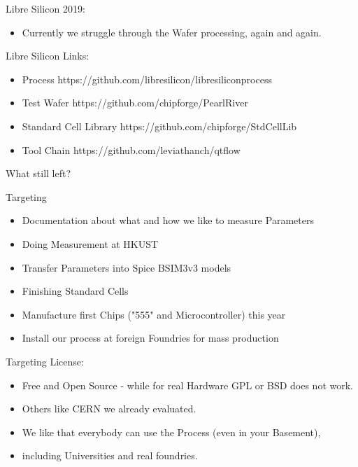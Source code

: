 \documentclass{beamer}
\begin{document}
\begin{frame}{Libre Silicon}
2019:
\begin{itemize}
\item Currently we struggle through the Wafer processing, again and again.
\end{itemize}
\end{frame}

\begin{frame}{Libre Silicon}
Links:
\begin{itemize}
\item Process
https://github.com/libresilicon/libresiliconprocess
\item Test Wafer
https://github.com/chipforge/PearlRiver
\item Standard Cell Library
https://github.com/chipforge/StdCellLib
\item Tool Chain
https://github.com/leviathanch/qtflow
\end{itemize}
\end{frame}


\begin{frame}
What still left?
\end{frame}

\begin{frame}{Targeting}
\begin{itemize}
\item Documentation about what and how we like to measure Parameters
\item Doing Measurement at HKUST
\item Transfer Parameters into Spice BSIM3v3 models
\item Finishing Standard Cells
\item Manufacture first Chips ("555" and Microcontroller) this year
\item Install our process at foreign Foundries for mass production
\end{itemize}
\end{frame}

\begin{frame}{Targeting}
License:
\begin{itemize}
\item Free and Open Source - while for real Hardware GPL or BSD does not work.
\item Others like CERN we already evaluated.
\item We like that everybody can use the Process (even in your Basement),
\item including Universities and real foundries.
\end{itemize}
\end{frame}
\end{document}
